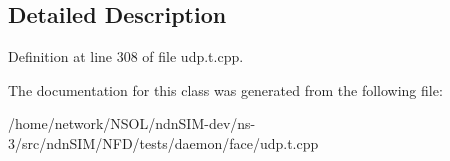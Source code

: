 \subsection{Detailed Description}


Definition at line 308 of file udp.\+t.\+cpp.



The documentation for this class was generated from the following file\+:\begin{DoxyCompactItemize}
\item 
/home/network/\+N\+S\+O\+L/ndn\+S\+I\+M-\/dev/ns-\/3/src/ndn\+S\+I\+M/\+N\+F\+D/tests/daemon/face/udp.\+t.\+cpp\end{DoxyCompactItemize}
